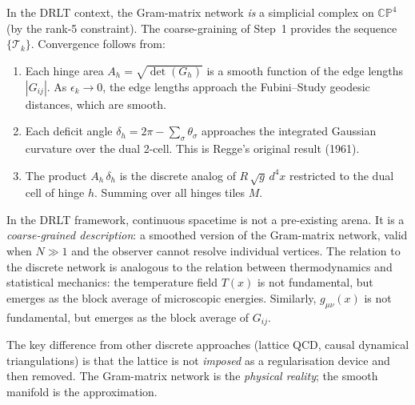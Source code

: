 In the DRLT context, the Gram-matrix network \emph{is} a simplicial complex on $\mathbb{CP}^4$ (by the rank-5 constraint).  The coarse-graining of Step~1 provides the sequence $\{\mathcal{T}_k\}$.  Convergence follows from:

\begin{enumerate}
\item Each hinge area $A_h = \sqrt{\det(G_h)}$ is a smooth function of the edge lengths $|G_{ij}|$.  As $\epsilon_k \to 0$, the edge lengths approach the Fubini--Study geodesic distances, which are smooth.

\item Each deficit angle $\delta_h = 2\pi - \sum_\sigma \theta_\sigma$ approaches the integrated Gaussian curvature over the dual 2-cell.  This is Regge's original result (1961).

\item The product $A_h\,\delta_h$ is the discrete analog of $R\,\sqrt{g}\,d^4x$ restricted to the dual cell of hinge $h$.  Summing over all hinges tiles $M$.
\end{enumerate}

\begin{remark}
In the DRLT framework, continuous spacetime is not a pre-existing arena.  It is a \emph{coarse-grained description}: a smoothed version of the Gram-matrix network, valid when $N \gg 1$ and the observer cannot resolve individual vertices.  The relation to the discrete network is analogous to the relation between thermodynamics and statistical mechanics: the temperature field $T(x)$ is not fundamental, but emerges as the block average of microscopic energies.  Similarly, $g_{\mu\nu}(x)$ is not fundamental, but emerges as the block average of $G_{ij}$.

The key difference from other discrete approaches (lattice QCD, causal dynamical triangulations) is that the lattice is not \emph{imposed} as a regularisation device and then removed.  The Gram-matrix network is the \emph{physical reality}; the smooth manifold is the approximation.
\end{remark}
